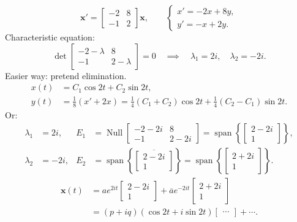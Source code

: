 \begin{example}
  \[
    \mathbf{x}'=
    \begin{bmatrix}
      -2 & 8 \\-1&2
    \end{bmatrix}
    \mathbf{x},
    \qquad
    \begin{cases}
      x'=-2x+8y, \\
      y'=-x+2y.
    \end{cases}
  \]
  Characteristic equation:
  \[
    \det
    \begin{bmatrix}
      -2-\lambda & 8 \\-1&2-\lambda
    \end{bmatrix}
    =0
    \quad\implies\quad\lambda_1=2i,\quad\lambda_2=-2i.
  \]
  Easier way: pretend elimination.
  \begin{align*}
    x(t) & =C_1\cos 2t+C_2\sin 2t, \\
    y(t) & =\frac18(x'+2x)
    =\frac14(C_1+C_2)\cos 2t+\frac14(C_2-C_1)\sin 2t.
  \end{align*}
  Or:
  \begin{align*}
    \lambda_1 & =2i,                                  &
    E_1       & =\operatorname{Null}
    \begin{bmatrix}
      -2-2i & 8 \\-1&2-2i
    \end{bmatrix}
    =\operatorname{span}\left\{
    \begin{bmatrix}
      2-2i \\1
    \end{bmatrix}
    \right\},                                           \\
    \lambda_2 & =-2i,                                 &
    E_2       & =\operatorname{span}\left\{\overline{
      \begin{bmatrix}
        2-2i \\1
      \end{bmatrix}
    }\right\}
    =\operatorname{span}\left\{
    \begin{bmatrix}
      2+2i \\1
    \end{bmatrix}
    \right\}.
  \end{align*}
  \begin{align*}
    \mathbf{x}(t) & =ae^{2it}
    \begin{bmatrix}
      2-2i \\1
    \end{bmatrix}
    +\overline{a}e^{-2it}
    \begin{bmatrix}
      2+2i \\1
    \end{bmatrix}
    \\
                  & =(p+iq)(\cos 2t+i\sin 2t)
    \begin{bmatrix}
      \cdots
    \end{bmatrix}
    +\cdots.
  \end{align*}
\end{example}


